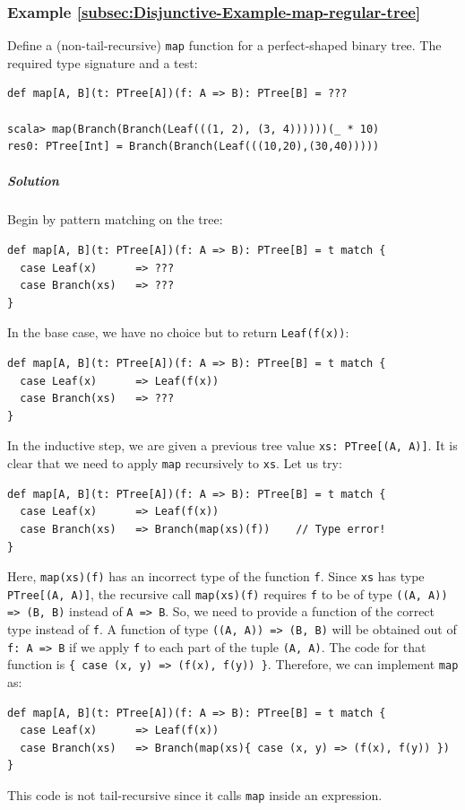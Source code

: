 \subsubsection{Example \label{subsec:Disjunctive-Example-map-regular-tree}\ref{subsec:Disjunctive-Example-map-regular-tree}}

Define a (non-tail-recursive) \lstinline!map! function for a perfect-shaped
binary tree. The required type signature and a test:
\begin{lstlisting}
def map[A, B](t: PTree[A])(f: A => B): PTree[B] = ???

scala> map(Branch(Branch(Leaf(((1, 2), (3, 4))))))(_ * 10)
res0: PTree[Int] = Branch(Branch(Leaf(((10,20),(30,40)))))
\end{lstlisting}


\subparagraph{Solution}

Begin by pattern matching on the tree:
\begin{lstlisting}
def map[A, B](t: PTree[A])(f: A => B): PTree[B] = t match {
  case Leaf(x)      => ???
  case Branch(xs)   => ???
}
\end{lstlisting}
In the base case, we have no choice but to return \lstinline!Leaf(f(x))!:
\begin{lstlisting}
def map[A, B](t: PTree[A])(f: A => B): PTree[B] = t match {
  case Leaf(x)      => Leaf(f(x))
  case Branch(xs)   => ???
}
\end{lstlisting}
In the inductive step, we are given a previous tree value \lstinline!xs: PTree[(A, A)]!.
It is clear that we need to apply \lstinline!map! recursively to
\lstinline!xs!. Let us try:
\begin{lstlisting}
def map[A, B](t: PTree[A])(f: A => B): PTree[B] = t match {
  case Leaf(x)      => Leaf(f(x))
  case Branch(xs)   => Branch(map(xs)(f))    // Type error!
}
\end{lstlisting}
Here, \lstinline!map(xs)(f)! has an incorrect type of the function
\lstinline!f!. Since \lstinline!xs! has type \lstinline!PTree[(A, A)]!,
the recursive call \lstinline!map(xs)(f)! requires \lstinline!f!
to be of type \lstinline!((A, A)) => (B, B)! instead of \lstinline!A => B!.
So, we need to provide a function of the correct type instead of \lstinline!f!.
A function of type \lstinline!((A, A)) => (B, B)! will be obtained
out of \lstinline!f: A => B! if we apply \lstinline!f! to each part
of the tuple \lstinline!(A, A)!. The code for that function is \lstinline!{ case (x, y) => (f(x), f(y)) }!.
Therefore, we can implement \lstinline!map! as:
\begin{lstlisting}
def map[A, B](t: PTree[A])(f: A => B): PTree[B] = t match {
  case Leaf(x)      => Leaf(f(x))
  case Branch(xs)   => Branch(map(xs){ case (x, y) => (f(x), f(y)) })
}
\end{lstlisting}
This code is not tail-recursive since it calls \lstinline!map! inside
an expression.

